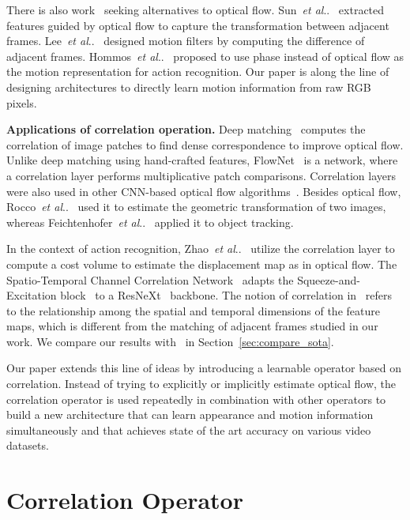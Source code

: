 \documentclass[10pt,twocolumn,letterpaper]{article}
\makeatletter
\DeclareRobustCommand\onedot{\futurelet\@let@token\@onedot}
\def\@onedot{\ifx\@let@token.\else.\null\fi\xspace}
\def\etal{\emph{et al}\onedot}
\makeatother
\begin{document}
There is also work~\cite{sun2018optical,lee2018motion,hommos2018using} seeking alternatives to optical flow. Sun~\etal~\cite{sun2018optical} extracted features guided by optical flow to capture the transformation between adjacent frames. Lee~\etal~\cite{lee2018motion} designed motion filters by computing the difference of adjacent frames. 
Hommos~\etal~\cite{hommos2018using} proposed to use phase instead of optical flow as the motion representation for action recognition. Our paper is along the line of designing architectures to directly learn motion information from raw RGB pixels.

\noindent\textbf{Applications of correlation operation.}  Deep matching~\cite{weinzaepfel2013deepflow} computes the correlation of image patches to find dense correspondence to improve optical flow. 
Unlike deep matching using hand-crafted features, FlowNet~\cite{FlowNet} is a network,
where a correlation layer performs multiplicative patch comparisons. 
Correlation layers were also used in other CNN-based optical flow algorithms~\cite{sun2018pwc,ilg2017flownet}. Besides optical flow, Rocco~\etal~\cite{rocco2017convolutional} used it to estimate the geometric transformation of two images, whereas Feichtenhofer~\etal~\cite{feichtenhofer2017detect} applied it to object tracking.

In the context of action recognition, Zhao~\etal~\cite{zhao2018recognize} utilize the correlation layer to compute a cost volume to estimate the displacement map as in optical flow. 
The Spatio-Temporal Channel Correlation Network~\cite{diba2018spatio} adapts the Squeeze-and-Excitation block~\cite{hu2018squeeze} to a ResNeXt~\cite{xie2017aggregated} backbone. The notion of correlation in~\cite{diba2018spatio} refers to the relationship among the spatial and temporal dimensions of the feature maps, which is different from the matching of adjacent frames studied in our work. We compare our results with~\cite{diba2018spatio} in Section~\ref{sec:compare_sota}.

Our paper extends this line of ideas by introducing a learnable operator based on correlation. Instead of trying to explicitly or implicitly estimate optical flow, the correlation operator is used repeatedly in combination with other operators to build a new architecture that can learn appearance and motion information simultaneously and that achieves state of the art accuracy on various video datasets.  \section{Correlation Operator}\label{sec:corr_op}
\end{document}
